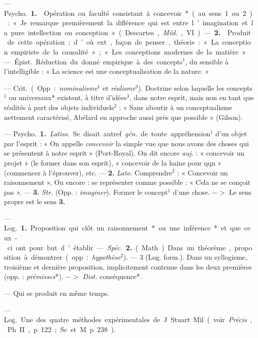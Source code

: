 \begin{itemize}[leftmargin=1cm, label=, itemsep=11pt]
 — \si{Psycho.} {\bf 1.}  Opération ou faculté consistant à concevoir* (au sens 1 ou 2) : « Je remarque
premièrement la diflérence qui est
entre l'imagination et la pure intellection ou conception » (Descartes,
{\it Méd.}, VI). — {\bf 2.}  Produit de cette
opération; d’où ext., façon de penser,
théorie : « La conception empiriste
de la causalité »; « Les conceptions
modernes de la matière ».

 — \si{Épist.} Réduction
du donné empirique à des concepts$^1$,
du sensible à l'intelligible : « La
science est une conceptualisation de
la nature. »

 — \si{Crit.} (Opp. : {\it nominalisme}$^1$ et {\it réalisme}$^3$).
 Doctrine
selon laquelle les concepts$^1$ ou universaux* existent, à titre d'idées$^3$,
dans notre esprit, mais non en tant
que réalités à part des objets individuels$^2$ : « Sans aboutir à un conceptualisme nettement caractérisé, Abélard en approche aussi près que possible » (Gilson).

 — \si{Psycho.} {\bf 1.} {\it Latiss.} Se
disait autref. {\it gén.} de toute appréhension$^1$ d’un objet par l'esprit : « On
appelle {\it concevoir} la simple vue que
nous avons des choses qui se présentent
à notre esprit » (Port-Royal).
On dit encore {\it auj.} : « concevoir un
projet » (le former dans son esprit),
« concevoir de la haine pour qqn »
(commencer à l’éprouver), etc. —
{\bf 2.}  {\it Lato.} Comprendre$^2$ : « Concevoir
un raisonnement », Ou encore : se
représenter comme possible : « Cela
ne se conçoit pas ». — {\bf 3.} {\it Str.} (Opp. :
{\it imaginer}). Former le concept$^1$ d’une
chose. $->$ Le sens propre est le
sens {\bf 3.}

 — \si{Log.} {\bf 1.} Proposition
qui clôt un raisonnement* ou une
inférence* et que ceux-ci ont pour
but d'établir. — {\it Spéc.} {\bf 2.} (Math)
Dans un théorème, proposition à
démontrer (opp. : {\it hypothèse}$^2$). —
3 (Log. form.). Dans un syllogisme, troisième et dernière proposition, implicitement contenue dans
les deux premières (opp. : {\it prémisses}*). $->$ {\it Dist.} conséquence*.

 — Qui se produit en
même temps.

 — \si{Log.}
Une des quatre méthodes expérimentales de J. Stuart Mil (voir
{\it Précis}, Ph. II, p. 122; Sc. et M.
p. 238).


\end{itemize}
